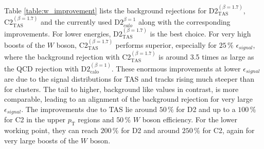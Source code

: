 Table \ref{table:w_improvement} lists the background rejections for $\text{D2}_{\text{TAS}}^{(\beta=1.7)}$, $\text{C2}_{\text{TAS}}^{(\beta=1.7)}$ and the currently used $\text{D2}^{\beta=1}_{calo}$ along with the corresponding improvements. For lower energies, $\text{D2}_{\text{TAS}}^{(\beta=1.7)}$ is the best choice. For very high boosts of the $W$ boson, $\text{C2}_{\text{TAS}}^{(\beta=1.7)}$ performs superior, especially for $25\,\%$ $\epsilon_{signal}$, where the background rejection with $\text{C2}_{\text{TAS}}^{(\beta=1.7)}$ is around 3.5 times as large as the QCD rejection with $\text{D2}^{(\beta=1)}_{\text{calo}}$.
These enormous improvements at lower $\epsilon_{signal}$ are due to the signal distributions for TAS and tracks rising much steeper than for clusters. The tail to higher, background like values in contrast, is more comparable, leading to an alignment of the background rejection for very large $\epsilon_{signal}$. The improvements due to TAS lie around $50\,\%$ for D2 and up to a $100\,\%$ for C2 in the upper $p_{\mathrm{T}}$ regions and $50\,\%$ $W$ boson efficiency. For the lower working point, they can reach $200\,\%$ for D2 and around $250\,\%$ for C2, again for very large boosts of the $W$ boson.
